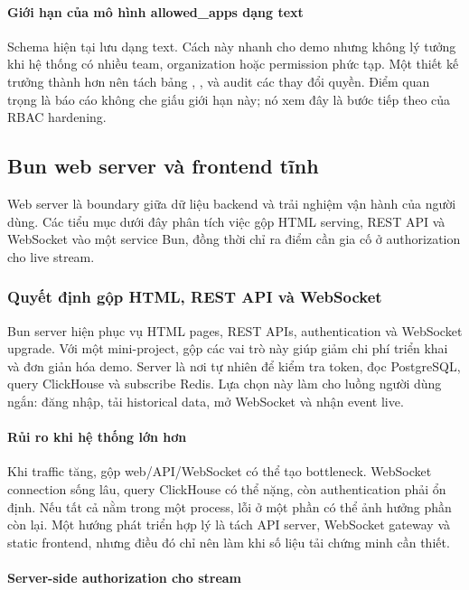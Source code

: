 \paragraph{Giới hạn của mô hình allowed\_apps dạng text}

Schema hiện tại lưu  dạng text. Cách này nhanh cho demo nhưng không lý tưởng khi hệ thống có nhiều team, organization hoặc permission phức tạp. Một thiết kế trưởng thành hơn nên tách bảng , ,  và audit các thay đổi quyền. Điểm quan trọng là báo cáo không che giấu giới hạn này; nó xem đây là bước tiếp theo của RBAC hardening.

\subsection{Bun web server và frontend tĩnh}

Web server là boundary giữa dữ liệu backend và trải nghiệm vận hành của người dùng. Các tiểu mục dưới đây phân tích việc gộp HTML serving, REST API và WebSocket vào một service Bun, đồng thời chỉ ra điểm cần gia cố ở authorization cho live stream.

\subsubsection{Quyết định gộp HTML, REST API và WebSocket}

Bun server hiện phục vụ HTML pages, REST APIs, authentication và WebSocket upgrade. Với một mini-project, gộp các vai trò này giúp giảm chi phí triển khai và đơn giản hóa demo. Server là nơi tự nhiên để kiểm tra token, đọc PostgreSQL, query ClickHouse và subscribe Redis. Lựa chọn này làm cho luồng người dùng ngắn: đăng nhập, tải historical data, mở WebSocket và nhận event live.

\paragraph{Rủi ro khi hệ thống lớn hơn}

Khi traffic tăng, gộp web/API/WebSocket có thể tạo bottleneck. WebSocket connection sống lâu, query ClickHouse có thể nặng, còn authentication phải ổn định. Nếu tất cả nằm trong một process, lỗi ở một phần có thể ảnh hưởng phần còn lại. Một hướng phát triển hợp lý là tách API server, WebSocket gateway và static frontend, nhưng điều đó chỉ nên làm khi số liệu tải chứng minh cần thiết.

\paragraph{Server-side authorization cho stream}

